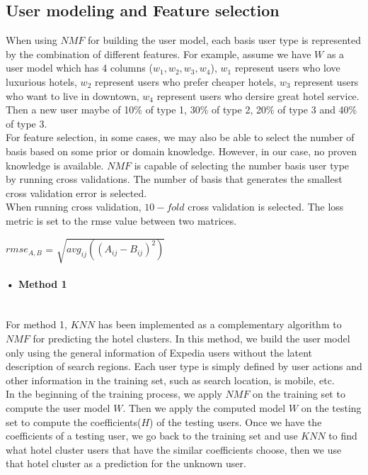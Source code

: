 \documentclass[11pt]{article} %
\begin{document}
\subsection{User modeling and Feature selection}
When using $NMF$ for building the user model, each basis user type is represented by the combination of different features. For example, assume we have $W$ as a user model which has 4 columns ($w_{1}, w_{2}, w_{3}, w_{4}$), $w_{1}$ represent users who love luxurious hotels, $w_{2}$ represent users who prefer cheaper hotels, $w_{3}$ represent users who want to live in downtown, $w_{4}$ represent users who dersire great hotel service. Then a new user maybe of 10\% of type 1, 30\% of type 2, 20\% of type 3 and 40\% of type 3.\\    
For feature selection, in some cases, we may also be able to select the number of basis based on some prior or domain knowledge. However, in our case, no proven knowledge is available. $NMF$ is capable of selecting the number basis user type by running cross validations. The number of basis that generates the smallest cross validation error is selected.\\
When running cross validation, $10-fold$ cross validation is selected. The loss metric is set to the rmse value between two matrices.\\
\centerline{$rmse_{A,B}$ = $\sqrt{avg_{ij}((A_{ij}-B_{ij})^{2})}$}

\paragraph{• Method 1}\mbox{}\\
For method 1, $KNN$ has been implemented as a complementary algorithm to $NMF$ for predicting the hotel clusters. In this method, we build the user model only using the general information of Expedia users without the latent description of search regions. Each user type is simply defined by user actions and other information in the training set, such as search location, is mobile, etc.\\
In the beginning of the training process, we apply $NMF$ on the training set to compute the user model $W$. Then we apply the computed model $W$ on the testing set to compute the coefficients($H$) of the testing users. Once we have the coefficients of a testing user, we go back to the training set and use $KNN$ to find what hotel cluster users that have the similar coefficients choose, then we use that hotel cluster as a prediction for the unknown user.
\end{document}
